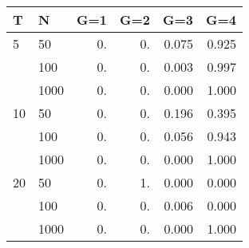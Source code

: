 \begin{tabular}{llrrrr}
\toprule
T & N & G=1 & G=2 & G=3 & G=4                \\
\midrule
5  & 50    &           0. &           0. &           0.075 &           0.925 \\
   & 100   &           0. &           0. &           0.003 &           0.997 \\
   & 1000  &           0. &           0. &           0.000 &           1.000 \\
10 & 50    &           0. &           0. &           0.196 &           0.395 \\
   & 100   &           0. &           0. &           0.056 &           0.943 \\
   & 1000  &           0. &           0. &           0.000 &           1.000 \\
20 & 50    &           0. &           1. &           0.000 &           0.000 \\
   & 100   &           0. &           0. &           0.006 &           0.000 \\
   & 1000  &           0. &           0. &           0.000 &           1.000 \\
\bottomrule
\end{tabular}
